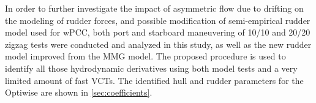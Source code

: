 \noindent In order to further investigate the impact of asymmetric flow due to drifting on the modeling of rudder forces, and possible modification of semi-empirical rudder model used for wPCC, both port and starboard maneuvering of 10/10 and 20/20 zigzag tests were conducted and analyzed in this study, as well as the new rudder model improved from the MMG model. The proposed procedure is used to identify all those hydrodynamic derivatives using both model tests and a very limited amount of fast VCTs. The identified hull and rudder parameters for the Optiwise are shown in \autoref{sec:coefficients}.